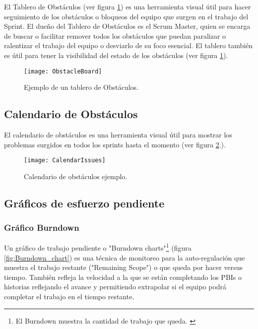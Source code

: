 El Tablero de Obstáculos (ver figura \ref{fig:ObstacleBoard}) es una herramienta visual útil para hacer seguimiento de los obstáculos o bloqueos del equipo que surgen en el trabajo del Sprint. El dueño del Tablero de Obstáculos es el Scrum Master, quien se encarga de buscar o facilitar remover todos los obstáculos que puedan paralizar o ralentizar el trabajo del equipo o desviarlo de su foco esencial. El tablero también es útil para tener la visibilidad del estado de los obstáculos (ver figura \ref{fig:ObstacleBoard}).

\begin{figure}[h]
  \centering
  \texttt{[image: ObstacleBoard]}
  \caption{Ejemplo de un tablero de Obstáculos.}
  \centering
  \label{fig:ObstacleBoard} %
\end{figure}

\subsection{Calendario de Obstáculos}

El calendario de obstáculos es una herramienta visual útil para mostrar los problemas surgidos en todos los sprints hasta el momento (ver figura \ref{fig:CalendarIssues}.).

\begin{figure}[h]
  \centering
  \texttt{[image: CalendarIssues]}
  \caption{Calendario de obstáculos ejemplo.}
  \centering
  \label{fig:CalendarIssues} %
\end{figure}

\subsection{Gráficos de esfuerzo pendiente}

\subsubsection{Gráfico Burndown}

Un gráfico de trabajo pendiente o "Burndown charts"\footnote{El Burndown muestra la cantidad de trabajo que queda. \cite{SBOK-2013}} (figura \ref{fig:Burndown_chart}) es una técnica de monitoreo para la auto-regulación que muestra el trabajo restante ("Remaining Scope") o que queda por hacer versus tiempo. También refleja la velocidad a la que se están completando los PBIs o historias reflejando el avance y permitiendo extrapolar si el equipo podrá completar el trabajo en el tiempo restante.

